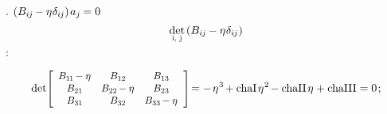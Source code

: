 \en{,}
.
${ ( B_{i\hspace{-0.1ex}j} \hspace{-0.15ex}
- \eta\hspace{.1ex} \delta_{i\hspace{-0.1ex}j} )
\hspace{.25ex} a_j \hspace{-0.1ex}
= 0 }$
\ru{,}
\begin{equation*}
\smash{%
   \underset{%
      \raisebox{.15em}{%
         \scalebox{.7}{ i, \hspace{.15ex}j }%
      } %
   } %
   { \determinant }%
} %
\hspace{.3ex}
( \somebivalenttensorcomponents{i\hspace{-0.1ex}j} \hspace{-0.15ex} - \eigenvalue \delta_{ i \hspace{-0.1ex} j } )
\end{equation*}
:

\nopagebreak\vspace{-0.1em}
\begin{equation}\label{chardetequation}
\determinant \hspace{-0.4ex}
\scalebox{.9}[.92]{$
   \left[
      \begin{array}{ccc}
         \somebivalenttensorcomponents{1\hspace{-0.1ex}1} \hspace{-0.16ex} - \eigenvalue & \somebivalenttensorcomponents{12} & \somebivalenttensorcomponents{13} \\
         \somebivalenttensorcomponents{21} & \somebivalenttensorcomponents{22} \hspace{-0.16ex} - \eigenvalue & \somebivalenttensorcomponents{23} \\
         \somebivalenttensorcomponents{31} & \somebivalenttensorcomponents{32} & \somebivalenttensorcomponents{33} \hspace{-0.16ex} - \eigenvalue
      \end{array}
   \hspace{.1ex}
   \right]
$} %
\hspace{-0.4ex} = - \hspace{.2ex}
\eigenvalue^3 \hspace{-0.25ex}
+ \firstcharacteristicinvariant \hspace{.25ex}
\eigenvalue^2 \hspace{-0.25ex}
- \secondcharacteristicinvariant \hspace{.25ex}
\eigenvalue
+ \thirdcharacteristicinvariant
= 0
\hspace{.2ex} ;
\end{equation}

